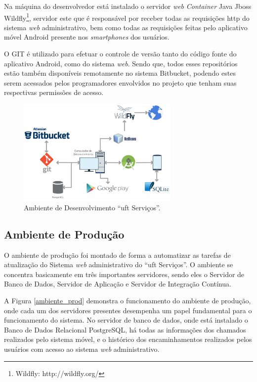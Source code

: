 Na máquina do desenvolvedor está instalado o servidor \textit{web} \textit{Container} Java Jboss Wildfly\footnote{Wildfly: http://wildfly.org/}, servidor este que é responsável por receber todas as requisições \gls{http} do sistema \textit{web} administrativo, bem como todas as requisições feitas pelo aplicativo móvel Android presente nos \textit{smartphones} dos usuários. 

O GIT é utilizado para efetuar o controle de versão tanto do código fonte do aplicativo Android, como do sistema \textit{web}. Sendo que, todos esses repositórios estão também disponíveis remotamente no sistema Bitbucket, podendo estes serem acessados pelos programadores envolvidos no projeto que tenham suas respectivas permissões de acesso.

\begin{figure}[H]
  \centering
  \includegraphics[width=0.7\textwidth]{figuras/develop.eps} 
  \caption{Ambiente de Desenvolvimento ``\acrshort{uft} Serviços''.}
  \label{ambiente_dev} 
\end{figure}

\subsection*{Ambiente de Produção}

\noindent O ambiente de produção foi montado de forma a automatizar as tarefas de atualização do Sistema \textit{web} administrativo do ``\acrshort{uft} Serviços''. O ambiente se concentra basicamente em três importantes servidores, sendo eles o Servidor de Banco de Dados, Servidor de Aplicação e Servidor de Integração Contínua.

A Figura \ref{ambiente_prod} demonstra o funcionamento do ambiente de produção, onde cada um dos servidores presentes desempenha um papel fundamental para o funcionamento do sistema. No servidor de banco de dados, onde está instalado o Banco de Dados Relacional PostgreSQL, há todas as informações dos chamados realizados pelo sistema móvel, e o histórico dos encaminhamentos realizados pelos usuários com acesso ao sistema \textit{web} administrativo. 

